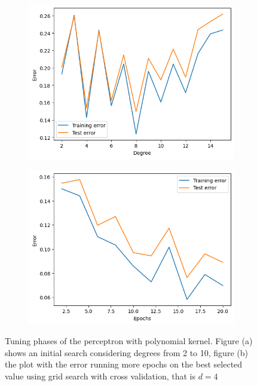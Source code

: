 \documentclass{article}
\begin{document}
\begin{figure}
	\centering
	\begin{subfigure}{0.45\columnwidth}
		\centering
		\includegraphics[width=\columnwidth]{../plots/kpoly_perceptron.png}
		\caption{}
		\label{subfig:kpoly_perceptron}
	\end{subfigure}
	\begin{subfigure}{0.45\columnwidth}
		\centering
		\includegraphics[width=\columnwidth]{../plots/kpoly2_perceptron.png}
		\caption{}
		\label{subfig:kpoly2_perceptron}
	\end{subfigure}
	\caption{Tuning phases of the perceptron with polynomial kernel. Figure (a) shows an initial search considering degrees from 2 to 10, figure (b) the plot with the error running more epochs on the best selected value using grid search with cross validation, that is $d=4$}
	\label{fig:kpoly_perceptron}
\end{figure}
\end{document}
